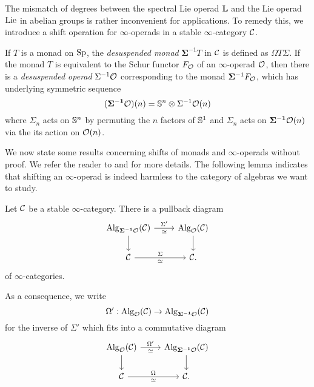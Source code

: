 The mismatch of degrees between the spectral Lie operad ${\mathbb{L}}$ and the Lie operad $\operatorname{Lie}$ in abelian groups is rather inconvenient for applications. To remedy this, we introduce a shift operation for $\infty$-operads in a stable $\infty$-category ${\mathcal{C}}$. 
\begin{definition}
\cite[Section 3]{Camarena_mod2_free_spectral_Lie_algebra} 
    If $T$ is a monad on $\operatorname{Sp}$, the \emph{desuspended monad} $\mathbf{\Sigma}^{-1}  T$ in ${\mathcal{C}}$ is defined as 
	$
	\Omega T\Sigma.
	$
	If the monad $T$ is equivalent to the Schur functor $F_{{\mathcal{O}}}$ of an $\infty$-operad ${\mathcal{O}}$, then there is a \emph{desuspended operad} $\Sigma^{-1}{\mathcal{O}}$ corresponding to the monad $\mathbf{\Sigma}^{-1} F_{{\mathcal{O}}}$, which has underlying symmetric sequence 
	$$
	(\mathbf{\Sigma^{-1}} {\mathcal{O}} ) (n)= {\mathbb{S}}^{n}\otimes\Sigma^{-1} {\mathcal{O}}(n)
	$$
	where $\Sigma_n$ acts on ${\mathbb{S}}^{n}$ by permuting the $n$ factors of ${\mathbb{S}}^{1}$ and $\Sigma_n$ acts on $\mathbf{\Sigma^{-1}} {\mathcal{O}}(n)$ via the its action on ${\mathcal{O}}(n)$.
\end{definition}

We now state some results concerning shifts of monads and $\infty$-operads without proof. We refer the reader to \cite[Section 2.2.4.]{Hadrianphdthesis} and \cite{Camarena_mod2_free_spectral_Lie_algebra} for more details.
The following lemma indicates that shifting an $\infty$-operad is indeed harmless to the category of algebras we want to study.
\begin{lemma}
\cite[Section 2.2.4.]{Hadrianphdthesis}
\label{Shift has no harm}
Let ${\mathcal{C}}$ be a stable $\infty$-category.
There is a pullback diagram
\[
    \begin{tikzcd}
	\Alg_{\bf{\Sigma}^{-1} \CO }(\CC)    & \Alg_{\CO}(\CC) \\
	 \CC & \CC
	\arrow[from=1-1, to = 1-2, "\Sigma'", "\simeq" below]
	\arrow[from=1-1 , to =2-1,  left]
	\arrow[from=1-2 , to =2-2,  right]
	\arrow[from=2-1, to=2-2, "\Sigma", "\simeq" below].
\end{tikzcd}
\]
of $\infty$-categories.
\end{lemma}
As a consequence, we write  
$$
\Omega':
\operatorname{Alg}_{{\mathcal{O}}}({\mathcal{C}}) \to \operatorname{Alg}_{\bf{\Sigma}^{-1} {\mathcal{O}} }({\mathcal{C}})
$$
for the inverse of $\Sigma'$
which fits into a commutative diagram
\[
    \begin{tikzcd}
	\Alg_{\CO}(\CC)    & \Alg_{\bf{\Sigma}^{-1} \CO }(\CC) \\
	 \CC & \CC
	\arrow[from=1-1, to = 1-2, "\Omega'", "\simeq" below]
	\arrow[from=1-1 , to =2-1,  left]
	\arrow[from=1-2 , to =2-2,  right]
	\arrow[from=2-1, to=2-2, "\Omega", "\simeq" below].
\end{tikzcd}
\]

